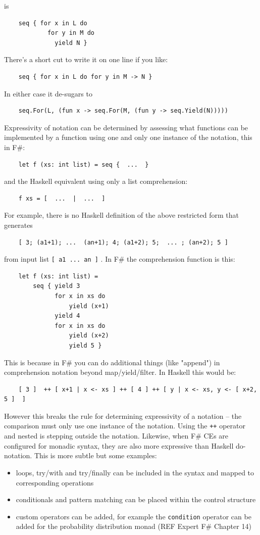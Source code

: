 \documentclass[acmsmall]{acmart}\settopmatter{}
\begin{document}
is
\begin{verbatim}
    seq { for x in L do 
            for y in M do 
              yield N }
\end{verbatim}
There’s a short cut to write it on one line if you like:
\begin{verbatim}
    seq { for x in L do for y in M -> N }
\end{verbatim}
In either case it de-sugars to
\begin{verbatim}
    seq.For(L, (fun x -> seq.For(M, (fun y -> seq.Yield(N)))))
\end{verbatim}
Expressivity of notation can be determined by assessing what functions can be implemented by a function using one and only
one instance of the notation, this in F\#:
\begin{verbatim}
    let f (xs: int list) = seq {  ...  }
\end{verbatim}
and the Haskell equivalent using only a list comprehension:
\begin{verbatim}
    f xs = [  ...  |  ...  ]
\end{verbatim}
For example, there is no Haskell definition of the above restricted form that generates
\begin{verbatim}
    [ 3; (a1+1); ...  (an+1); 4; (a1+2); 5;  ... ; (an+2); 5 ]
\end{verbatim}
from input list \texttt{[ a1 ... an ]} . In F\# the comprehension function is this:
\begin{verbatim}
    let f (xs: int list) =
        seq { yield 3
              for x in xs do 
                  yield (x+1)
              yield 4 
              for x in xs do
                  yield (x+2)
                  yield 5 }
\end{verbatim}
This is because in F\# you can do additional things (like "append") in comprehension notation beyond map/yield/filter.
In Haskell this would be:
\begin{verbatim}
    [ 3 ]  ++ [ x+1 | x <- xs ] ++ [ 4 ] ++ [ y | x <- xs, y <- [ x+2, 5 ]  ]
\end{verbatim}
However this breaks the rule for determining expressivity of a notation – the comparison must only use one instance of the notation.
Using the \texttt{++} operator and nested is stepping outside the notation.
Likewise, when F\# CEs are configured for monadic syntax, they are also more expressive than Haskell do-notation.   This is more subtle but some examples:
\begin{itemize}
\item loops, try/with and try/finally can be included in the syntax and mapped to corresponding operations

\item conditionals and pattern matching can be placed within the control structure

\item custom operators can be added, for example the \texttt{condition} operator can be added for the probability distribution monad (REF Expert F\# Chapter 14)
\end{itemize}
\end{document}

